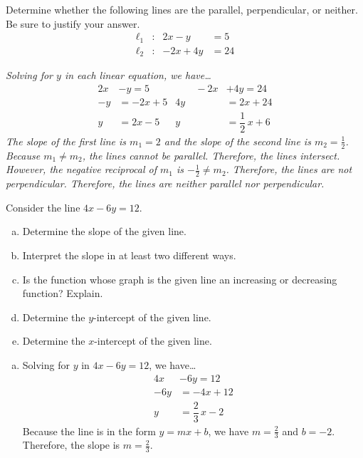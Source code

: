 \documentclass[12pt,letterpaper]{exam}
\begin{document}
\begin{questions}
\newpage
\question[10] Determine whether the following lines are the parallel, perpendicular, or neither. Be sure to justify your answer. 
	\[
	\begin{aligned}
	\ell_1 &\colon & 2x - y&= 5 \\[0.3cm]
	\ell_2 &\colon & -2x + 4y&= 24
	\end{aligned}
	\] \pspace

{\noindent \itshape Solving for $y$ in each linear equation, we have\dots
	\[
	\begin{aligned}
	2x &- y= 5 & \qquad -2x &+ 4y= 24 \\[0.3cm]
	-y&= -2x + 5 & 4y&= 2x + 24 \\[0.3cm]
	y&= 2x - 5 & y&= \dfrac{1}{2}\,x + 6
	\end{aligned}
	\]
The slope of the first line is $m_1= 2$ and the slope of the second line is $m_2= \frac{1}{2}$. Because $m_1 \neq m_2$, the lines cannot be parallel. Therefore, the lines intersect. However, the negative reciprocal of $m_1$ is $-\frac{1}{2} \neq m_2$. Therefore, the lines are not perpendicular. Therefore, the lines are neither parallel nor perpendicular. 
}



\newpage
\question[10] Consider the line $4x - 6y= 12$.
	\begin{enumerate}[(a)]
	\item Determine the slope of the given line.
	\item Interpret the slope in at least two different ways.
	\item Is the function whose graph is the given line an increasing or decreasing function? Explain. 
	\item Determine the $y$-intercept of the given line. 
	\item Determine the $x$-intercept of the given line. 
	\end{enumerate} 

{\itshape
\sol
\begin{enumerate}[(a)]
\item Solving for $y$ in $4x - 6y= 12$, we have\dots
	\[
	\begin{aligned}
	4x &- 6y= 12 \\
	-6y&= -4x + 12 \\
	y&= \dfrac{2}{3}\,x - 2
	\end{aligned}
	\]
Because the line is in the form $y= mx + b$, we have $m= \frac{2}{3}$ and $b= -2$. Therefore, the slope is $m= \frac{2}{3}$. 


\end{enumerate}}
\end{questions}
\end{document}
